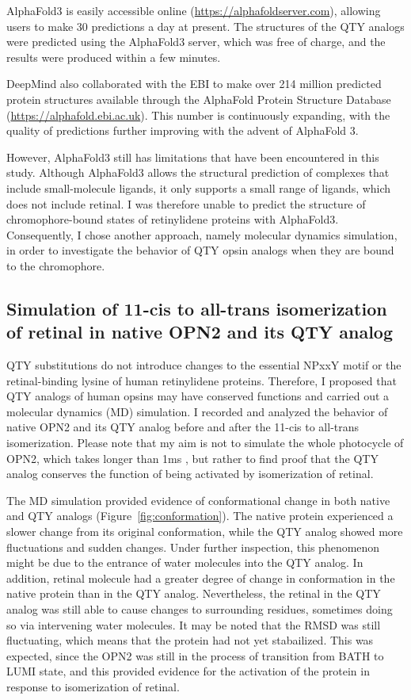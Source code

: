 \documentclass[fleqn, 10pt]{manuscript}
\begin{document}
AlphaFold3 is easily accessible online (\url{https://alphafoldserver.com}), allowing users to make 30 predictions a day at present. The structures of the QTY analogs were predicted using the AlphaFold3 server, which was free of charge, and the results were produced within a few minutes. 

DeepMind also collaborated with the EBI to make over 214 million predicted protein structures available through the AlphaFold Protein Structure Database (\url{https://alphafold.ebi.ac.uk}). This number is continuously expanding, with the quality of predictions further improving with the advent of AlphaFold 3. 

However, AlphaFold3 still has limitations that have been encountered in this study. Although AlphaFold3 allows the structural prediction of complexes that include small-molecule ligands, it only supports a small range of ligands, which does not include retinal. I was therefore unable to predict the structure of chromophore-bound states of retinylidene proteins with AlphaFold3. Consequently, I chose another approach, namely molecular dynamics simulation, in order to investigate the behavior of QTY opsin analogs when they are bound to the chromophore. 

\subsection*{Simulation of 11-cis to all-trans isomerization of retinal in native OPN2 and its QTY analog}

QTY substitutions do not introduce changes to the essential NPxxY motif or the retinal-binding lysine of human retinylidene proteins. Therefore, I proposed that QTY analogs of human opsins may have conserved functions and carried out a molecular dynamics (MD) simulation. I recorded and analyzed the behavior of native OPN2 and its QTY analog before and after the 11-cis to all-trans isomerization. Please note that my aim is not to simulate the whole photocycle of OPN2, which takes longer than 1ms \citep{Fanelli_2021}, but rather to find proof that the QTY analog conserves the function of being activated by isomerization of retinal. 

The MD simulation provided evidence of conformational change in both native and QTY analogs (Figure~\ref{fig:conformation}). The native protein experienced a slower change from its original conformation, while the QTY analog showed more fluctuations and sudden changes. Under further inspection, this phenomenon might be due to the entrance of water molecules into the QTY analog. In addition, retinal molecule had a greater degree of change in conformation in the native protein than in the QTY analog. Nevertheless, the retinal in the QTY analog was still able to cause changes to surrounding residues, sometimes doing so via intervening water molecules. It may be noted that the RMSD was still fluctuating, which means that the protein had not yet stabailized. This was expected, since the OPN2 was still in the process of transition from BATH to LUMI state, and this provided evidence for the activation of the protein in response to isomerization of retinal. 
\end{document}
